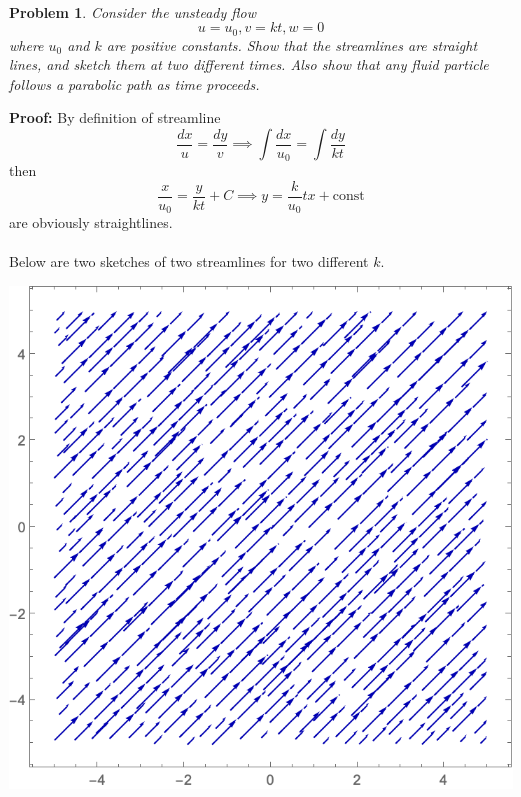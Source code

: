 \documentclass[12pt]{article}
\newtheorem{problem}{Problem}
\begin{document}
\\
\begin{problem}
    Consider the unsteady flow
    $$
        u=u_0, v=kt, w=0
    $$
    where $u_0$ and $k$ are positive constants. Show that the streamlines are straight lines, and sketch them at two different times. Also show that any fluid particle follows a parabolic path as time proceeds.
\end{problem}

\textbf{Proof:} By definition of streamline
$$
    \frac{dx}{u}=\frac{dy}{v}\implies \int\frac{dx}{u_0}=\int\frac{dy}{kt}
$$ then 
$$
    \frac{x}{u_0}=\frac{y}{kt}+C\implies y=\frac{k}{u_0}tx+\text{const} 
$$ are obviously straightlines. \\
\\
\indent Below are two sketches of two streamlines for two different $k$. \\
\begin{minipage}{0.45\textwidth}
  \centering
  \includegraphics[scale=0.5]{images/streamline2.png}
\end{minipage}
\hfill
\end{document}
